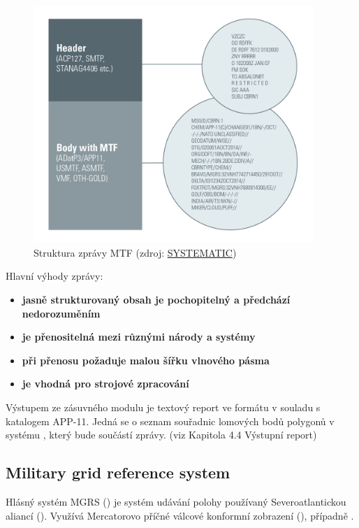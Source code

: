 \begin{figure}[H]
    \centering
      \includegraphics[width=300pt]{./pictures/Military-Messaging-white-borders-988px.png}
      \caption[Struktura zprávy MTF]{Struktura zprávy MTF
      (zdroj: \href{https://systematic.com/defence/products/a/military-messaging/app-11-and-adatp-3/}{SYSTEMATIC})}
      \label{fig:systematic}
  \end{figure}
  
Hlavní výhody  zprávy:

\begin{itemize}
	\item \textbf{jasně strukturovaný obsah je pochopitelný a předchází nedorozuměním} 
	\item \textbf{je přenositelná mezi různými národy a systémy} 
	\item \textbf{při přenosu požaduje malou šířku vlnového pásma}
	\item \textbf{je vhodná pro strojové zpracování}
\end{itemize}

Výstupem ze zásuvného modulu je textový report ve formátu v souladu s katalogem APP-11. Jedná se o seznam souřadnic lomových bodů polygonů v systému , který bude součástí  zprávy. (viz Kapitola 4.4 Výstupní report)

\subsection{Military grid reference system}
Hlásný systém MGRS () je systém udávání polohy používaný Severoatlantickou aliancí (). Využívá Mercatorovo příčné válcové konformní zobrazení (), případně . 


